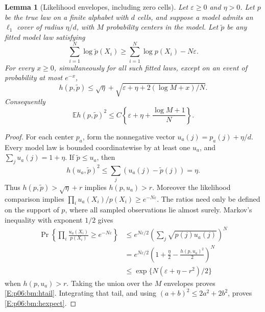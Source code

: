\documentclass[11pt,a4paper]{article}
\newtheorem{lemma}[theorem]{Lemma}
\theoremstyle{definition}
\theoremstyle{remark}
\numberwithin{equation}{section}
\begin{document}
\begin{lemma}[Likelihood envelopes, including zero cells]
\label{E:p06:bm:envelopes}
Let $\varepsilon\ge0$ and $\eta>0$. Let $p$ be the true law on a finite alphabet with $d$ cells, and suppose a
model admits an $\ell_1$ cover of radius $\eta/d$, with $M$ probability
centers in the model. Let $\widetilde p$ be any fitted model law satisfying
\[
 \sum_{i=1}^N\log\widetilde p(X_i)
 \ge\sum_{i=1}^N\log p(X_i)-N\varepsilon.
\]
For every $x\ge0$, simultaneously for all such fitted laws, except on an
event of probability at most $e^{-x}$,
\begin{equation}\label{E:p06:bm:htail}
 h(p,\widetilde p)
 \le\sqrt\eta+
       \sqrt{\varepsilon+\eta+2(\log M+x)/N}.
\end{equation}
Consequently
\begin{equation}\label{E:p06:bm:hexpect}
 \mathbb E h(p,\widetilde p)^2
 \le C\left\{\varepsilon+\eta+\frac{\log M+1}{N}\right\}.
\end{equation}
\end{lemma}
\begin{proof}
For each center $p_a$, form the nonnegative vector
$u_a(j)=p_a(j)+\eta/d$. Every model law is bounded coordinatewise by at
least one $u_a$, and $\sum_j u_a(j)=1+\eta$. If $\widetilde p\le u_a$,
then
\[
 h(u_a,\widetilde p)^2\le\sum_j(u_a(j)-\widetilde p(j))=\eta.
\]
Thus $h(p,\widetilde p)>\sqrt\eta+r$ implies $h(p,u_a)>r$.
Moreover the likelihood comparison implies
$\prod_i u_a(X_i)/p(X_i)\ge e^{-N\varepsilon}$.
The ratios need only be defined on the support of $p$, where all sampled
observations lie almost surely. Markov's inequality with exponent $1/2$
gives
\begin{align*}
 \Pr\left\{\prod_i\frac{u_a(X_i)}{p(X_i)}
                      \ge e^{-N\varepsilon}\right\}
 &\le e^{N\varepsilon/2}
        \left(\sum_j\sqrt{p(j)u_a(j)}\right)^N\\
 &=e^{N\varepsilon/2}
        \left(1+\frac\eta2-\frac{h(p,u_a)^2}{2}\right)^N\\
 &\le\exp\{N(\varepsilon+\eta-r^2)/2\}
\end{align*}
when $h(p,u_a)>r$. Taking the union over the $M$ envelopes proves
\eqref{E:p06:bm:htail}. Integrating that tail, and using
$(a+b)^2\le2a^2+2b^2$, proves \eqref{E:p06:bm:hexpect}.
\end{proof}
\end{document}
